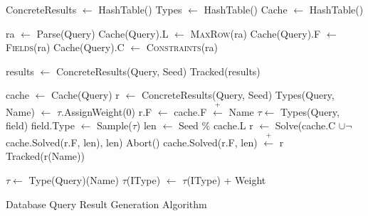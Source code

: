 \documentclass[10pt,conference]{IEEEtran}
\begin{document}


\begin{algorithm}[] 
\label{proc:sql-imp}
\begin{algorithmic}[1]

  \State ConcreteResults $\leftarrow$ HashTable()
  \State Types $\leftarrow$ HashTable()
  \State Cache $\leftarrow$ HashTable()
\EndProcedure

        \State ra $\leftarrow$ Parse(Query)
       \State Cache(Query).L $\leftarrow$ \textsc{MaxRow}(ra)
        \State Cache(Query).F $\leftarrow$ \textsc{Fields}(ra)
        \State Cache(Query).C $\leftarrow$ \textsc{Constraints}(ra)

    \EndIf
  \State results $\leftarrow$ ConcreteResults(Query, Seed)
  \State \Return Tracked(results)
\EndProcedure

   \State cache $\leftarrow$ Cache(Query)
   \State r $\leftarrow$ ConcreteResults(Query, Seed)
        \State Types(Query, Name) $\leftarrow$ $\tau$.AssignWeight(0)
    \EndIf
    \State r.F $\leftarrow$ cache.F $\overset{+}{\leftarrow}$ Name
          \State $\tau \leftarrow$ Types(Query, field)
          \State field.Type $\leftarrow$ Sample($\tau$)
         \EndIf
    \EndFor
    \State len $\leftarrow$ Seed \% cache.L
    \State r $\leftarrow$ Solve(cache.C $\cup \neg$ cache.Solved(r.F, len), len)
     \Return Abort()
    \EndIf
    \State cache.Solved(r.F, len) $\overset{+}{\leftarrow}$ r
    \State \Return Tracked(r(Name))
\EndProcedure

   \State $\tau \leftarrow$ Type(Query)(Name)
   \State $\tau$(IType) $\leftarrow$ $\tau$(IType) + Weight
\EndProcedure
\end{algorithmic}
\caption{Database Query Result Generation Algorithm}
\end{algorithm}
\end{document}
